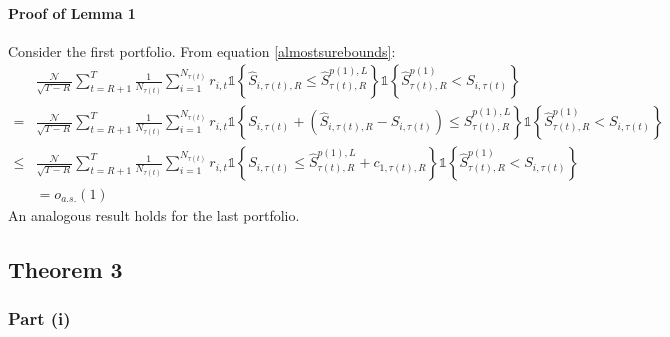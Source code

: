 \paragraph{Proof of Lemma 1}
Consider the first portfolio. From equation \eqref{almostsurebounds}:
\begin{align*}
&\frac{\mathcal{N}}{\sqrt{T-R}}\sum_{t=R+1}^{T}\frac{1}{N_{\tau(t) }}\sum_{i=1}^{N_{\tau(t) }}r_{i,t} \mathds{1} \left\{ \widehat{S}_{i,\tau(t) ,R}\leq \widehat{S}_{\tau(t),R}^{p(1),L}\right\} \mathds{1} \left\{ \widehat{S}_{\tau(t),R}^{p(1)} < S_{i,\tau(t) } \right\}  \\
=&\frac{\mathcal{N}}{\sqrt{T-R}}\sum_{t=R+1}^{T}\frac{1}{N_{\tau(t) }}\sum_{i=1}^{N_{\tau(t) }}r_{i,t} \mathds{1} \left\{ S_{i,\tau(t) }+\left( \widehat{S}_{i,\tau(t),R}-S_{i,\tau(t) }\right) \leq \widehat{S}_{\tau(t) ,R}^{p(1),L}\right\} \mathds{1} \left\{ \widehat{S}_{\tau(t) ,R}^{p(1)} < S_{i,\tau(t) } \right\}  \\
\leq &\frac{\mathcal{N}}{\sqrt{T-R}}\sum_{t=R+1}^{T}\frac{1}{N_{\tau(t) }}\sum_{i=1}^{N_{\tau(t) }}r_{i,t} \mathds{1} \left\{ S_{i,\tau(t) }\leq \widehat{S}_{\tau(t),R}^{p(1),L}+c_{1,\tau(t),R} \right\} \mathds{1} \left\{ \widehat{S}_{\tau(t) ,R}^{p(1)}  < S_{i,\tau(t) } \right\}  \\ %
&= o_{a.s.}(1)
\end{align*} 
An analogous result holds for the last portfolio.




\subsection{Theorem 3}
\label{Proof of th:feasible}

\subsubsection{Part (i)}

